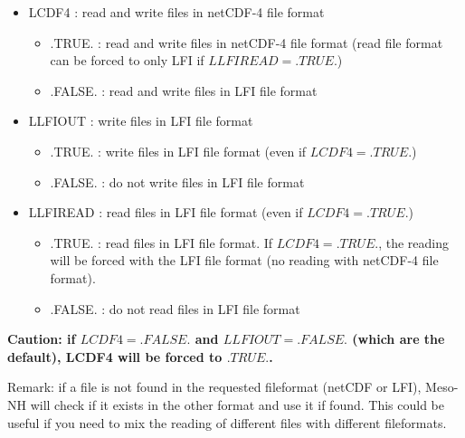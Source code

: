 \begin{itemize}

\item
LCDF4 : read and write files in netCDF-4 file format

\begin{itemize}
\item   .TRUE.  : read and write files in netCDF-4 file format (read file format can be forced to only LFI if $LLFIREAD=.TRUE.$)
\item   .FALSE. : read and write files in LFI file format
\end{itemize}

\item
LLFIOUT : write files in LFI file format

\begin{itemize}
\item   .TRUE.  : write files in LFI file format (even if $LCDF4=.TRUE.$)
\item   .FALSE. : do not write files in LFI file format
\end{itemize}

\item
LLFIREAD : read files in LFI file format (even if $LCDF4=.TRUE.$)

\begin{itemize}
\item   .TRUE.  : read files in LFI file format. If $LCDF4=.TRUE.$, the reading will be forced with the LFI file format (no reading with netCDF-4 file format).
\item   .FALSE. : do not read files in LFI file format
\end{itemize}

\end{itemize}

{\bf Caution: if $LCDF4=.FALSE.$ and $LLFIOUT=.FALSE.$ (which are the default), LCDF4 will be forced to $.TRUE.$.}

Remark: if a file is not found in the requested fileformat (netCDF or LFI), Meso-NH will check if it exists in the other format and use it if found.
This could be useful if you need to mix the reading of different files with different fileformats.


